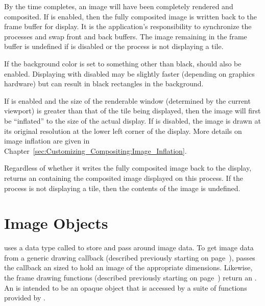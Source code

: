 By the time  completes, an image will have been
completely rendered and composited.  If  is
enabled, then the fully composited image is written back to the \OpenGL
frame buffer for display.  It is the application's responsibility to
synchronize the processes and swap front and back buffers.  The image
remaining in the frame buffer is undefined if  is
disabled or the process is not displaying a tile.

If the \OpenGL background color is set to something other than black,
 should also be enabled.
Displaying with  disabled may
be slightly faster (depending on graphics hardware) but can result in black
rectangles in the background.

If  is enabled and the size of the
renderable window (determined by the current \OpenGL viewport) is greater
than that of the tile being displayed, then the image will first be
``inflated'' to the size of the actual display.  If
 is disabled, the image is drawn at its
original resolution at the lower left corner of the display.  More details
on image inflation are given in
Chapter~\ref{sec:Customizing_Compositing:Image_Inflation}.

Regardless of whether it writes the fully composited image back to the
display,  returns an  containing
the composited image displayed on this process.  If the process is not
displaying a tile, then the contents of the image is undefined.


\section{Image Objects}
\label{sec:Basic_Usage:Image_Objects}

\IceT uses a data type called  to store and pass around
image data.  To get image data from a generic drawing callback (described
previously starting on
page~\pageref{sec:Basic_Usage:Drawing_Callback:Generic}), \IceT passes the
callback an  sized to hold an image of the appropriate
dimensions.  Likewise, the frame drawing functions (described previously
starting on page~\pageref{sec:Basic_Usage:Rendering}) return an
.  An  is intended to be an opaque object
that is accessed by a suite of functions provided by \IceT.

